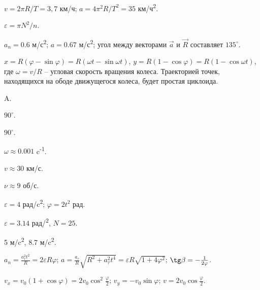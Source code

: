 \begin{Answer}{39}
$v = 2 \pi R/T = 3,7$ км/ч; $a = 4\pi^2 R/T^2 = 35$ км/ч\textsuperscript{2}.
\end{Answer}
\begin{Answer}{40}
$\varepsilon = \pi N^2/n$.
\end{Answer}
\begin{Answer}{41}
$a_n = 0.6$ м/с\textsuperscript{2}; $a = 0.67$ м/с\textsuperscript{2}; угол между векторами $\vec{a}$ и $\vec{R}$ составляет $135^{\circ}$.
\end{Answer}
\begin{Answer}{43}
$x= R(\varphi - \sin \varphi) = R(\omega t - \sin \omega t)$, $y=R(1-\cos \varphi) = R(1-\cos \omega t)$, где $\omega = v/R$ -- угловая скорость вращения колеса. Траекторией точек, находящихся на ободе движущегося колеса, будет простая циклоида.
\end{Answer}
\begin{Answer}{45}
A.
\end{Answer}
\begin{Answer}{46}
$90^{\circ}$.
\end{Answer}
\begin{Answer}{47}
$90^{\circ}$.
\end{Answer}
\begin{Answer}{48}
$\omega \approx 0.001$ c\textsuperscript{-1}.
\end{Answer}
\begin{Answer}{49}
$v \approx 30$ км/с.
\end{Answer}
\begin{Answer}{50}
$\nu \approx 9$ об/с.
\end{Answer}
\begin{Answer}{51}
$\varepsilon = 4$ рад/c\textsuperscript{2}; $\varphi = 2t^2$ рад.
\end{Answer}
\begin{Answer}{52}
$\varepsilon =  3.14$ рад/\textsuperscript{2}, $N = 25$.
\end{Answer}
\begin{Answer}{53}
5 м/c\textsuperscript{2}, 8.7 м/c\textsuperscript{2}.
\end{Answer}
\begin{Answer}{54}
$a_n = \frac{a_{\tau}^2 t^2}{R} = 2 \varepsilon R \varphi$; $a = \frac{a_{\tau}}{R} \sqrt{R^2 + a_{\tau}^2 t^4} = \varepsilon R \sqrt{1 + 4 \varphi^2}$; $\tg \beta = -\frac{1}{2\varphi}$.
\end{Answer}
\begin{Answer}{55}
$v_x = v_0 (1 + \cos \varphi) = 2v_0 \cos^2 \frac{\varphi}{2}$; $v_y = -v_0 \sin \varphi$; $v = 2v_0 \cos \frac{\varphi}{2}$.
\end{Answer}

